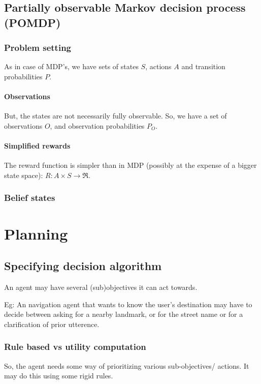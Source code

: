 \documentclass[oneside, article]{memoir}
\begin{document}
\section{Partially observable Markov decision process (POMDP)}
\subsection{Problem setting}
As in case of MDP's, we have sets of states $S$, actions $A$ and transition probabilities $P$. 

\subsubsection{Observations}
But, the states are not necessarily fully observable. So, we have a set of observations $O$, and observation probabilities $P_O$.

\subsubsection{Simplified rewards}
The reward function is simpler than in MDP (possibly at the expense of a bigger state space): $R: A \times S \to \Re$.

\subsection{Belief states}


\tbc

\chapter{Planning}
\section{Specifying decision algorithm}
An agent may have several (sub)objectives it can act towards.

Eg: An navigation agent that wants to know the user's destination may have to decide between asking for a nearby landmark, or for the street name or for a clarification of prior utterence.

\subsection{Rule based vs utility computation}
So, the agent needs some way of prioritizing various sub-objectives/ actions. It may do this using some rigid rules.
\end{document}
